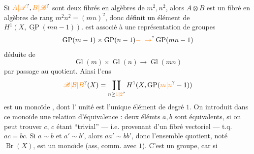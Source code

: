 Si $\unsure{A|\mathscr{A}},\unsure{B|\mathscr{B}}$ sont deux fibrés en algèbres de  $m^2,n^2$, alors $A\otimes B$ est un fibré en algèbres de rang $m^2n^2=(mn)^2$, donc définit un élément de $H^1(X,\underline{\operatorname{GP}}(mn-1))$.  est associé à une représentation de groupes
\[
\operatorname{GP}(m-1)\times\operatorname{GP}(n-1)\unsure{-|\to}\operatorname{GP}(mn-1)
\]
déduite de
\[
\operatorname{Gl}(m)\times\operatorname{Gl}(n)\longrightarrow\operatorname{Gl}(mn)
\]
par passage au quotient. Ainsi l'ens
\[
\unsure{\mathscr{B}|\mathcal{B}|B}(X)=\coprod_{n\geq\unsure{1|2}}H^1(X,\operatorname{GP}(\unsure{m|n}-1))
\]
est un monoïde , dont l' unité est l'unique élément de degré $1$. On  introduit dans ce monoïde une relation d'équivalence : deux  élémts $a,b$ sont équivalents, si on peut trouver $c$, $c$ étant ``trivial'' --- i.e. provenant d'un fibré vectoriel --- t.q. $ac=bc$. Si $a\sim b$ et $a'\sim b'$, alors $aa'\sim bb'$, donc l'ensemble quotient, noté $\operatorname{Br}(X)$, est un monoïde  (ass, comm. avec $1$). C'est  un groupe, car si
